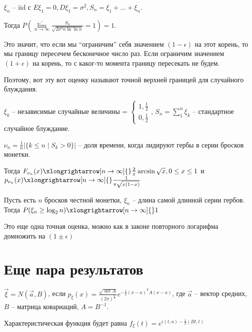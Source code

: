 \begin{theorem}
$\xi_n$ -- iid с $E \xi_1 = 0, D\xi_1 = \sigma^2, S_n = \xi_1 + \dots + \xi_n$.

Тогда $P(\bar {\lim\limits_{n \to \infty}} \frac{S_n}{\sqrt{2 \sigma^2 n \ln \ln n}} = 1) = 1$.
\end{theorem}                                                                               
\begin{Rem}
Это значит, что если мы ``ограничим'' себя значением $(1 - \epsilon)$ на этот корень, то мы границу пересечем бесконечное число раз.
Если ограничим значением $(1 + \epsilon)$ на корень, то с каког-то момента границу пересекать не будем.

Поэтому, вот эту вот оценку называют точной верхней границей для случайного блуждания.
\end{Rem}

\begin{theorem}

$\xi_k$ -- независимые случайные величины = $\begin{cases} 1, \frac12 \\ 0, \frac12 \end{cases}$, $S_n = \sum\limits_1^n \xi_k$ -- стандартное случайное блуждание.

$\nu_n = \frac1n |\{k \leq n  \mid S_k > 0 \} |$ -- доля времени, когда лидируют гербы в серии бросков монетки.

Тогда $F_{\nu_n}(x) \xlongrightarrow[n \to \infty]{} \frac{2}{\pi} \arcsin \sqrt{x}, 0 \leq x \leq 1$ и $p_{\nu_n}(x) \xlongrightarrow[n \to \infty]{} \frac{1}{\pi \sqrt{x(1-x)}}$
\end{theorem}

\begin{theorem}
Пусть есть $n$ бросков честной монетки, $\xi_n$ -- длина самой длинной серии гербов. Тогда $P(\xi_n \geq \log_2 n) \xlongrightarrow[n \to \infty]{} 1$
\end{theorem}
\begin{Rem}
Это еще одна точная оценка, можно как в законе повторного логарифма домножить на $(1 \pm \epsilon)$
\end{Rem}

\section{Еще пара результатов}
\begin{Def}
$\vec{\xi} = N(\vec{a}, B)$, если $p_\xi (x) = \frac{\sqrt{\det A}}{(2\pi)^{\frac{n}{2}}} e^{-\frac12 (x - a)^TA(x - a)}$, где
$\vec{a}$ -- вектор средних, $B$ -- матрица ковариаций, $A = B^{-1}$.

Характеристическая функция будет равна $f_\xi(t) = e^{i(t, a) - \frac12(Bt, t)}$
\end{Def}

